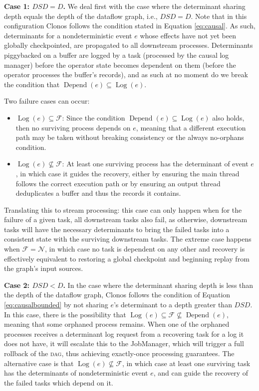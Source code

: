 \documentclass[sigconf]{acmart}
\DeclareMathOperator{\Depend}{Depend}
\DeclareMathOperator{\Log}{Log}
\newcommand{\para}[1]{\vspace{1mm}\noindent\textbf{#1.}}
\begin{document}
\para{Case 1: $DSD = D$} We deal first with the case where the determinant sharing depth equals the depth of the dataflow graph, i.e., $DSD = D$. 
Note that in this configuration Clonos follows the condition stated in Equation \ref{eq:causal}. As such, determinants for a nondeterministic event $e$ whose effects have not yet been globally checkpointed, are propagated to all downstream processes. Determinants piggybacked on a buffer are logged by a task (processed by the causal log manager) before the operator state becomes dependent on them (before the operator processes the buffer's records), and as such at no moment do we break the condition that $\Depend(e) \subseteq \Log(e)$. 


\noindent Two failure cases can occur:
\begin{itemize}
\item $\Log(e) \subseteq \mathcal{F}$: Since the condition $\Depend(e) \subseteq \Log(e)$ also holds, then no surviving process depends on $e$, meaning that a different execution path may be taken without breaking consistency or the always no-orphans condition. 
\item $\Log(e) \nsubseteq \mathcal{F}$: At least one surviving process has the determinant of event $e$, in which case it guides the recovery, either by ensuring the main thread follows the correct execution path or by ensuring an output thread deduplicates a buffer and thus the records it contains. 
\end{itemize}

Translating this to stream processing: this case can only happen when for the failure of a given task, all downstream tasks also fail, as otherwise, downstream tasks will have the necessary determinants to bring the failed tasks into a consistent state with the surviving downstream tasks. The extreme case happens when $\mathcal{F} = \mathcal{N}$, in which case no task is dependent on any other and recovery is effectively equivalent to restoring a global checkpoint and beginning replay from the graph's input sources.

\para{Case 2: $DSD<D$} In the case where the determinant sharing depth is less than the depth of the dataflow graph, Clonos follows the condition of Equation \ref{eq:causalbounded} by not sharing $e$'s determinant to a depth greater than $DSD$. In this case, there is the possibility that $\Log(e) \subseteq \mathcal{F} \nsubseteq \Depend(e)$, meaning that some orphaned process remains.  When one of the orphaned processes receives a determinant log request from a recovering task for a log it does not have, it will escalate this to the JobManager, which will trigger a full rollback of the \textsc{dag}, thus achieving exactly-once processing guarantees. The alternative case is that $\Log(e) \nsubseteq \mathcal{F}$, in which case at least one surviving task has the determinants of nondeterministic event $e$, and can guide the recovery of the failed tasks which depend on it.
\end{document}
